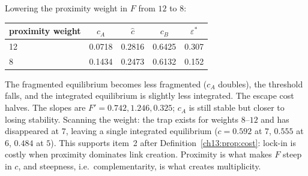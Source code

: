 \documentclass[../solutions_manual.tex]{subfiles}
\begin{document}
 Lowering the proximity weight in $F$ from $12$ to $8$:
\begin{center}
\begin{tabular}{lcccc}
\toprule
proximity weight & $c_A$ & $\hat c$ & $c_B$ & $\varepsilon^*$ \\
\midrule
12 & 0.0718 & 0.2816 & 0.6425 & 0.307 \\
8 & 0.1434 & 0.2473 & 0.6132 & 0.152 \\
\bottomrule
\end{tabular}
\end{center}
The fragmented equilibrium becomes less fragmented ($c_A$ doubles), the threshold falls, and the integrated equilibrium is slightly less integrated. The escape cost halves. The slopes are $F' = 0.742, 1.246, 0.325$; $c_A$ is still stable but closer to losing stability. Scanning the weight: the trap exists for weights $8$--$12$ and has disappeared at $7$, leaving a single integrated equilibrium ($c = 0.592$ at $7$, $0.555$ at $6$, $0.484$ at $5$). This supports item~2 after Definition~\ref{ch13:prop:cost}: lock-in is costly when proximity dominates link creation. Proximity is what makes $F$ steep in $c$, and steepness, i.e.\ complementarity, is what creates multiplicity.
\end{document}
